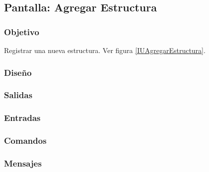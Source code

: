 \subsection{Pantalla: Agregar Estructura}

\subsubsection{Objetivo}
Registrar una nueva estructura.  Ver figura \ref{IUAgregarEstructura}. 

\subsubsection{Diseño}

\subsubsection{Salidas}

\subsubsection{Entradas}


\subsubsection{Comandos}


\subsubsection{Mensajes}




